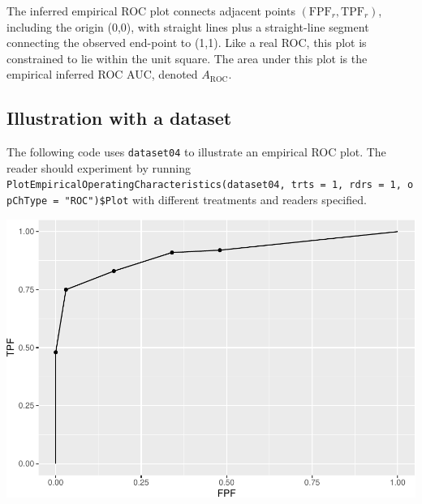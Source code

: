 \documentclass[
]{book}
\newenvironment{Shaded}{\begin{snugshade}}{\end{snugshade}}
\newcommand{\AttributeTok}[1]{\textcolor[rgb]{0.77,0.63,0.00}{#1}}
\newcommand{\DecValTok}[1]{\textcolor[rgb]{0.00,0.00,0.81}{#1}}
\newcommand{\FunctionTok}[1]{\textcolor[rgb]{0.00,0.00,0.00}{#1}}
\newcommand{\NormalTok}[1]{#1}
\newcommand{\OtherTok}[1]{\textcolor[rgb]{0.56,0.35,0.01}{#1}}
\newcommand{\SpecialCharTok}[1]{\textcolor[rgb]{0.00,0.00,0.00}{#1}}
\newcommand{\StringTok}[1]{\textcolor[rgb]{0.31,0.60,0.02}{#1}}
\begin{document}
The inferred empirical ROC plot connects adjacent points \(\left( \text{FPF}_r, \text{TPF}_r \right )\), including the origin (0,0), with straight lines plus a straight-line segment connecting the observed end-point to (1,1). Like a real ROC, this plot is constrained to lie within the unit square. The area under this plot is the empirical inferred ROC AUC, denoted \(A_{\text{ROC}}\).

\hypertarget{froc-empirical-roc-plot-illustration}{%
\subsection{Illustration with a dataset}\label{froc-empirical-roc-plot-illustration}}

The following code uses \texttt{dataset04} to illustrate an empirical ROC plot. The reader should experiment by running \texttt{PlotEmpiricalOperatingCharacteristics(dataset04,\ trts\ =\ 1,\ rdrs\ =\ 1,\ opChType\ =\ "ROC")\$Plot} with different treatments and readers specified.

\begin{Shaded}
\end{Shaded}

\includegraphics{13a-froc-empirical1_files/figure-latex/unnamed-chunk-4-1.pdf}
\end{document}
